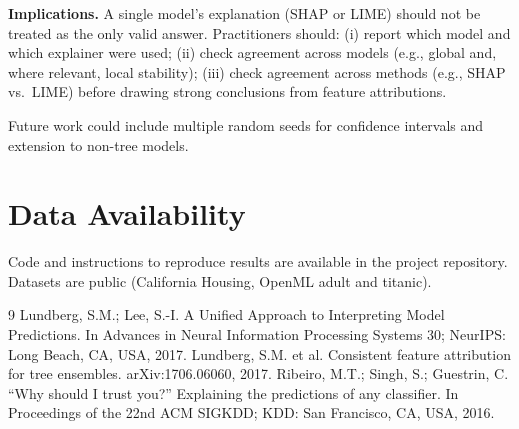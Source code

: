 \documentclass[11pt,a4paper]{article}
\begin{document}
\textbf{Implications.} A single model's explanation (SHAP or LIME) should not be treated as the only valid answer. Practitioners should: (i) report which model and which explainer were used; (ii) check agreement across models (e.g., global and, where relevant, local stability); (iii) check agreement across methods (e.g., SHAP vs.\ LIME) before drawing strong conclusions from feature attributions.

Future work could include multiple random seeds for confidence intervals and extension to non-tree models.

\section*{Data Availability}
Code and instructions to reproduce results are available in the project repository. Datasets are public (California Housing, OpenML adult and titanic).

\begin{thebibliography}{9}
  Lundberg, S.M.; Lee, S.-I. A Unified Approach to Interpreting Model Predictions. In Advances in Neural Information Processing Systems 30; NeurIPS: Long Beach, CA, USA, 2017.
  Lundberg, S.M. et al. Consistent feature attribution for tree ensembles. arXiv:1706.06060, 2017.
  Ribeiro, M.T.; Singh, S.; Guestrin, C. ``Why should I trust you?'' Explaining the predictions of any classifier. In Proceedings of the 22nd ACM SIGKDD; KDD: San Francisco, CA, USA, 2016.
\end{thebibliography}
\end{document}
